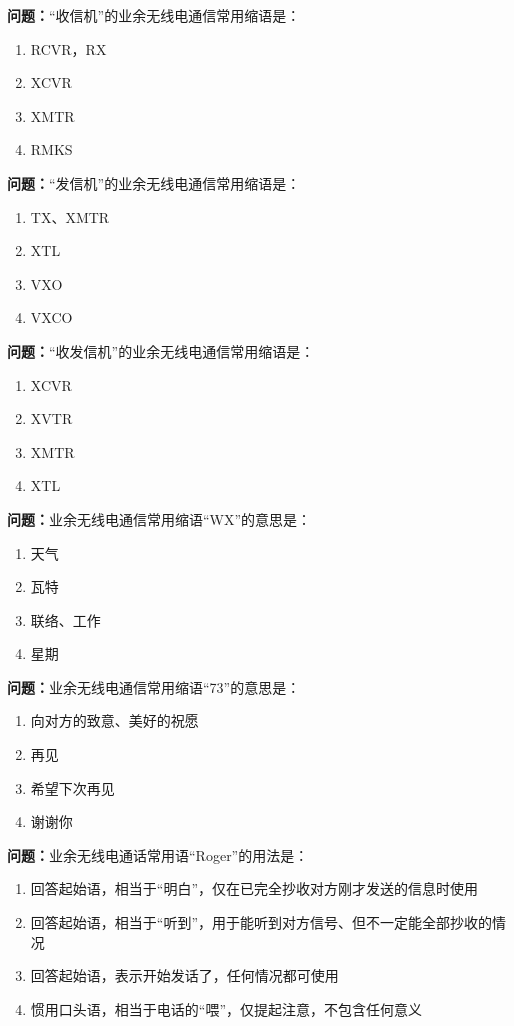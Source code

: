 \documentclass[UTF8]{ctexbook}
\begin{document}
\textbf{问题：}“收信机”的业余无线电通信常用缩语是：
\begin{enumerate}[label=\Alph*), leftmargin=3em]
  \item RCVR，RX
  \item XCVR
  \item XMTR
  \item RMKS
\end{enumerate}

\textbf{问题：}“发信机”的业余无线电通信常用缩语是：
\begin{enumerate}[label=\Alph*), leftmargin=3em]
  \item TX、XMTR
  \item XTL
  \item VXO
  \item VXCO
\end{enumerate}

\textbf{问题：}“收发信机”的业余无线电通信常用缩语是：
\begin{enumerate}[label=\Alph*), leftmargin=3em]
  \item XCVR
  \item XVTR
  \item XMTR
  \item XTL
\end{enumerate}

\textbf{问题：}业余无线电通信常用缩语“WX”的意思是：
\begin{enumerate}[label=\Alph*), leftmargin=3em]
  \item 天气
  \item 瓦特
  \item 联络、工作
  \item 星期
\end{enumerate}

\textbf{问题：}业余无线电通信常用缩语“73”的意思是：
\begin{enumerate}[label=\Alph*), leftmargin=3em]
  \item 向对方的致意、美好的祝愿
  \item 再见
  \item 希望下次再见
  \item 谢谢你
\end{enumerate}

\textbf{问题：}业余无线电通话常用语“Roger”的用法是：
\begin{enumerate}[label=\Alph*), leftmargin=3em]
  \item 回答起始语，相当于“明白”，仅在已完全抄收对方刚才发送的信息时使用
  \item 回答起始语，相当于“听到”，用于能听到对方信号、但不一定能全部抄收的情况
  \item 回答起始语，表示开始发话了，任何情况都可使用
  \item 惯用口头语，相当于电话的“喂”，仅提起注意，不包含任何意义
\end{enumerate}
\end{document}
